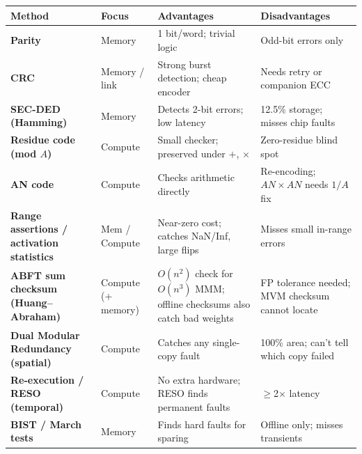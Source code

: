 \documentclass[10pt]{article}
\begin{document}
{\small
	\noindent
	\begin{tabularx}{\textwidth}{@{} L{3.9cm} L{1.7cm} Y Y @{}}
		\toprule
		\textbf{Method}                                   & \textbf{Focus}     & \textbf{Advantages}                                                       & \textbf{Disadvantages}                          \\
		\midrule
		\textbf{Parity}                                   & Memory             & 1 bit/word; trivial logic                                                 & Odd-bit errors only                             \\
		\textbf{CRC}                                      & Memory / link      & Strong burst detection; cheap encoder                                     & Needs retry or companion ECC                    \\
		\textbf{SEC-DED (Hamming)}                        & Memory             & Detects 2-bit errors; low latency                                         & 12.5\% storage; misses chip faults              \\
		\textbf{Residue code (mod $A$)}                   & Compute            & Small checker; preserved under $+$, $\times$                              & Zero-residue blind spot                         \\
		\textbf{AN code}                                  & Compute            & Checks arithmetic directly                                                & Re-encoding; $AN \times AN$ needs $1/A$ fix     \\
		\textbf{Range assertions / activation statistics} & Mem / Compute      & Near-zero cost; catches NaN/Inf, large flips                              & Misses small in-range errors                    \\
		\textbf{ABFT sum checksum (Huang--Abraham)}       & Compute (+ memory) & $O(n^2)$ check for $O(n^3)$ MMM; offline checksums also catch bad weights & FP tolerance needed; MVM checksum cannot locate \\
		\textbf{Dual Modular Redundancy (spatial)}        & Compute            & Catches any single-copy fault                                             & 100\% area; can't tell which copy failed        \\
		\textbf{Re-execution / RESO (temporal)}           & Compute            & No extra hardware; RESO finds permanent faults                            & $\ge$2$\times$ latency                          \\
		\textbf{BIST / March tests}                       & Memory             & Finds hard faults for sparing                                             & Offline only; misses transients                 \\
		\bottomrule
	\end{tabularx}}
\end{document}
